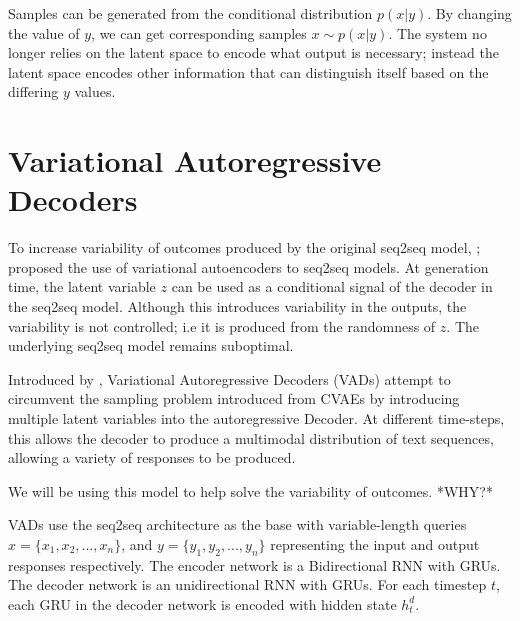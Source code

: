 \documentclass[12pt,twoside]{report}
\begin{document}
Samples can be generated from the conditional distribution $p(x|y)$. By changing the value of $y$, we can get corresponding samples $x \sim p(x|y)$. The system no longer relies on the latent space to encode what output is necessary; instead the latent space encodes other information that can distinguish itself based on the differing $y$ values.



\section{Variational Autoregressive Decoders}

To increase variability of outcomes produced by the original seq2seq model, \cite{serban_hierarchical_2016}; \cite{zhao_learning_2017} proposed the use of variational autoencoders to seq2seq models. At generation time, the latent variable $z$ can be used as a conditional signal of the decoder in the seq2seq model. Although this introduces variability in the outputs, the variability is not controlled; i.e it is produced from the randomness of $z$. The underlying seq2seq model remains suboptimal.

Introduced by \cite{du_variational_2018}, Variational Autoregressive Decoders (VADs) attempt to circumvent the sampling problem introduced from CVAEs by introducing multiple latent variables into the autoregressive Decoder. At different time-steps, this allows the decoder to produce a multimodal distribution of text sequences, allowing a variety of responses to be produced. 

We will be using this model to help solve the variability of outcomes. *WHY?*

VADs use the seq2seq architecture as the base with variable-length queries $x = \{x_1, x_2, ..., x_n\}$, and $y = \{y_1, y_2, ..., y_n\}$ representing the input and output responses respectively. The encoder network is a Bidirectional RNN with GRUs. The decoder network is an unidirectional RNN with GRUs. For each timestep $t$, each GRU in the decoder network is encoded with hidden state $h^d_t$.
\end{document}
